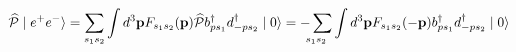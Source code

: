 \begin{equation*}
\widehat{\mathcal{P}}\mid e^{+}e^{-}\rangle =\underset{s_{1}s_{2}}{\sum }%
\int d^{3}\mathbf{p}F_{s_{1}s_{2}}(\mathbf{p})\widehat{\mathcal{P}}%
b_{ps_{1}}^{\dagger }d_{-ps_{2}}^{\dagger }\mid 0\rangle =\underset{%
s_{1}s_{2}}{-\sum }\int d^{3}\mathbf{p}F_{s_{1}s_{2}}(-\mathbf{p}%
)b_{ps_{1}}^{\dagger }d_{-ps_{2}}^{\dagger }\mid 0\rangle
\end{equation*}

